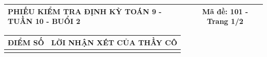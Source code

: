 \documentclass[12pt,a4paper]{article}
\begin{document}
\pagestyle{empty}
\noindent
\begin{tabularx}{\linewidth}{|X|c|}
\hline
\textbf{PHIẾU KIỂM TRA ĐỊNH KỲ TOÁN 9 - TUẦN 10 - BUỔI 2} & \textbf{Mã đề: 101 - Trang 1/2} \\
\hline
\end{tabularx}

\vspace{1.0mm}

\noindent
\begin{tabularx}{\linewidth}{|p{3.2cm}|X|}
\hline
\centering\textbf{ĐIỂM SỐ} & \centering\textbf{LỜI NHẬN XÉT CỦA THẦY CÔ} \tabularnewline
\hline
\rule{0pt}{1.8cm} & \tabularnewline
\hline
\end{tabularx}
\end{document}
